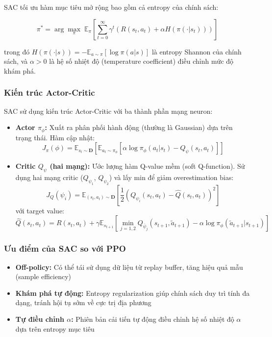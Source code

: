 SAC tối ưu hàm mục tiêu mở rộng bao gồm cả entropy của chính sách:

\begin{equation}
    \pi^* = \arg\max_\pi \; \mathbb{E}_\pi \left[ \sum_{t=0}^{\infty} \gamma^t \left( R(s_t, a_t) + \alpha H\left(\pi(\cdot | s_t)\right) \right) \right]
    \label{eq:sac_objective}
\end{equation}

\noindent trong đó $H(\pi(\cdot|s)) = -\mathbb{E}_{a \sim \pi}[\log \pi(a|s)]$ là entropy Shannon của chính sách, và $\alpha > 0$ là hệ số nhiệt độ (temperature coefficient) điều chỉnh mức độ khám phá.

\subsubsection{Kiến trúc Actor-Critic}

SAC sử dụng kiến trúc Actor-Critic với ba thành phần mạng neuron:

\begin{itemize}
    \item \textbf{Actor $\pi_\phi$:} Xuất ra phân phối hành động (thường là Gaussian) dựa trên trạng thái. Hàm cập nhật:
    \begin{equation}
        J_\pi(\phi) = \mathbb{E}_{s_t \sim \mathbf{D}} \left[ \mathbb{E}_{a_t \sim \pi_\phi} \left[ \alpha \log \pi_\phi(a_t | s_t) - Q_\psi(s_t, a_t) \right] \right]
    \end{equation}
    
    \item \textbf{Critic $Q_\psi$ (hai mạng):} Ước lượng hàm Q-value mềm (soft Q-function). Sử dụng hai mạng critic ($Q_{\psi_1}$, $Q_{\psi_2}$) và lấy min để giảm overestimation bias:
    \begin{equation}
        J_Q(\psi_i) = \mathbb{E}_{(s_t, a_t) \sim \mathbf{D}} \left[ \frac{1}{2} \left( Q_{\psi_i}(s_t, a_t) - \hat{Q}(s_t, a_t) \right)^2 \right]
    \end{equation}
    với target value:
    \begin{equation}
        \hat{Q}(s_t, a_t) = R(s_t, a_t) + \gamma \mathbb{E}_{s_{t+1}} \left[ \min_{j=1,2} Q_{\bar{\psi}_j}(s_{t+1}, \tilde{a}_{t+1}) - \alpha \log \pi_\phi(\tilde{a}_{t+1} | s_{t+1}) \right]
    \end{equation}
\end{itemize}

\subsubsection{Ưu điểm của SAC so với PPO}
\begin{itemize}
    \item \textbf{Off-policy:} Có thể tái sử dụng dữ liệu từ replay buffer, tăng hiệu quả mẫu (sample efficiency)
    \item \textbf{Khám phá tự động:} Entropy regularization giúp chính sách duy trì tính đa dạng, tránh hội tụ sớm về cực trị địa phương
    \item \textbf{Tự điều chỉnh $\alpha$:} Phiên bản cải tiến tự động điều chỉnh hệ số nhiệt độ $\alpha$ dựa trên entropy mục tiêu \cite{haarnoja2018sac_v2}
\end{itemize}

